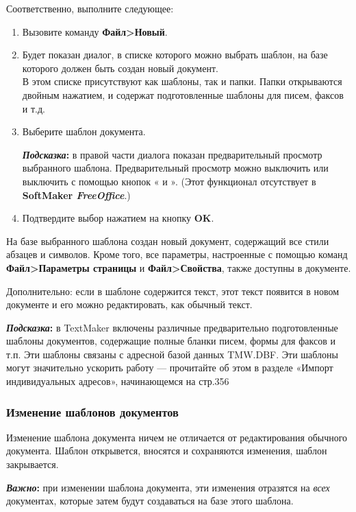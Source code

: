 \documentclass[a4paper,10pt]{article}
\begin{document}
Соответственно, выполните следующее:
\begin{enumerate}
 \item Вызовите команду \textbf{Файл>Новый}.
 \item Будет показан диалог, в списке которого можно выбрать шаблон, на базе которого должен быть создан новый документ.\\
 В этом списке присутствуют как шаблоны, так и папки. Папки открываются двойным нажатием, и содержат подготовленные шаблоны для писем, факсов и т.д.
 \item Выберите шаблон документа.
 \begin{mdframed}[backgroundcolor=blue!10]
\textbf{\textit{Подсказка}:} в правой части диалога показан предварительный просмотр выбранного шаблона. Предварительный просмотр можно выключить или выключить с помощью кнопок « и ». (Этот функционал отсутствует в \textbf{SoftMaker \textit{FreeOffice}}.)
\end{mdframed}
\item Подтвердите выбор нажатием на кнопку \textbf{OK}.
\end{enumerate}

На базе выбранного шаблона создан новый документ, содержащий все стили абзацев и символов. Кроме того, все параметры, настроенные с помощью команд \textbf{Файл>Параметры страницы} и \textbf{Файл>Свойства}, также доступны в документе.

Дополнительно: если в шаблоне содержится текст, этот текст появится в новом документе и его можно редактировать, как обычный текст.

\begin{mdframed}[backgroundcolor=blue!10]
\textbf{\textit{Подсказка}:} в TextMaker включены различные предварительно подготовленные шаблоны документов, содержащие полные бланки писем, формы для факсов и т.п. Эти шаблоны связаны с адресной базой данных TMW.DBF. Эти шаблоны могут значительно ускорить работу --- прочитайте об этом в разделе «Импорт индивидуальных адресов», начинающемся на стр.356
\end{mdframed}

\subsubsection{Изменение шаблонов документов}
Изменение шаблона документа ничем не отличается от редактирования обычного документа. Шаблон открывется, вносятся и сохраняются изменения, шаблон закрывается. 

\begin{mdframed}[backgroundcolor=blue!10]
\textbf{\textit{Важно}:} при изменении шаблона документа, эти изменения отразятся на \textit{всех} документах, которые затем будут создаваться на базе этого шаблона.
\end{mdframed}
\end{document}
